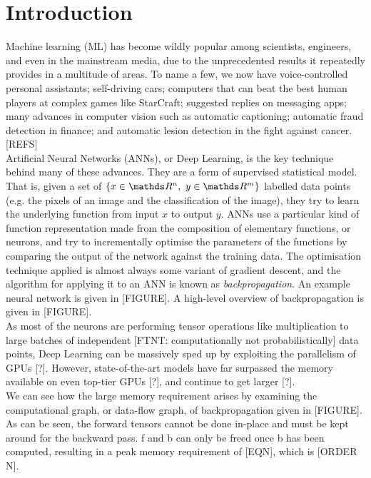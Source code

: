 \section{Introduction}
Machine learning (ML) has become wildly popular among scientists, engineers, and even in the mainstream media, due to the unprecedented results it repeatedly provides in a multitude of areas. To name a few, we now have voice-controlled personal assistants; self-driving cars; computers that can beat the best human players at complex games like StarCraft; suggested replies on messaging apps; many advances in computer vision such as automatic captioning; automatic fraud detection in finance; and automatic lesion detection in the fight against cancer. [REFS] \\

Artificial Neural Networks (ANNs), or Deep Learning, is the key technique behind many of these advances. They are a form of supervised statistical model. That is, given a set of \(\{x \in \R^n, \ y \in \R^m\}\) labelled data points (e.g. the pixels of an image and the classification of the image), they try to learn the underlying function from input \(x\) to output \(y\). ANNs use a particular kind of function representation made from the composition of elementary functions, or neurons, and try to incrementally optimise the parameters of the functions by comparing the output of the network against the training data. The optimisation technique applied is almost always some variant of gradient descent, and the algorithm for applying it to an ANN is known as \textit{backpropagation}. An example neural network is given in [FIGURE]. A high-level overview of backpropagation is given in [FIGURE]. \\

As most of the neurons are performing tensor operations like multiplication to large batches of independent [FTNT: computationally not probabilistically] data points, Deep Learning can be massively sped up by exploiting the parallelism of GPUs [?]. However, state-of-the-art models have far surpassed the memory available on even top-tier GPUs [?], and continue to get larger [?]. \\

We can see how the large memory requirement arises by examining the computational graph, or data-flow graph, of backpropagation given in [FIGURE]. As can be seen, the forward tensors cannot be done in-place and must be kept around for the backward pass. f and b can only be freed once b has been computed, resulting in a peak memory requirement of [EQN], which is [ORDER N]. \\

